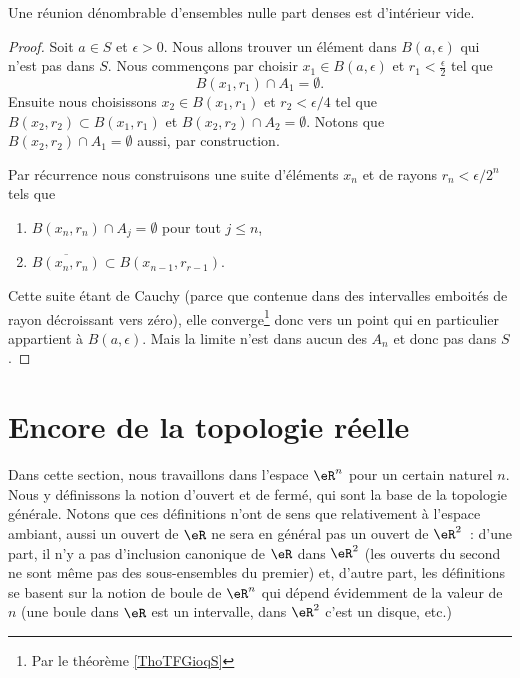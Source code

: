 \begin{theorem}      \label{ThoQGalIO}
    Une réunion dénombrable d'ensembles nulle part denses est d'intérieur vide.
\end{theorem}

\begin{proof}
    Soit \( a\in S\) et \( \epsilon>0\). Nous allons trouver un élément dans \( B(a,\epsilon)\) qui n'est pas dans \( S\). Nous commençons par choisir \( x_1\in B(a,\epsilon)\) et \( r_1<\frac{ \epsilon }{2}\) tel que
    \begin{equation}
        B(x_1,r_1)\cap A_1=\emptyset.
    \end{equation}
    Ensuite nous choisissons \( x_2\in B(x_1,r_1)\) et \( r_2<\epsilon/4\) tel que \( B(x_2,r_2)\subset B(x_1,r_1)\) et \( B(x_2,r_2)\cap A_2=\emptyset\). Notons que \( B(x_2,r_2)\cap A_1=\emptyset\) aussi, par construction.

    Par récurrence nous construisons une suite d'éléments \( x_n\) et de rayons \( r_n<\epsilon/2^n\) tels que
    \begin{enumerate}
        \item
            \( B(x_n,r_n)\cap A_j=\emptyset\) pour tout \( j\leq n\),
        \item
            \( \overline{ B(x_n,r_n) }\subset B(x_{n-1},r_{r-1})\).
    \end{enumerate}
    Cette suite étant de Cauchy (parce que contenue dans des intervalles emboités de rayon décroissant vers zéro), elle converge\footnote{Par le théorème \ref{ThoTFGioqS}} donc vers un point qui en particulier appartient à \( B(a,\epsilon)\). Mais la limite n'est dans aucun des \( A_n\) et donc pas dans \( S\).
\end{proof}

\section{Encore de la topologie réelle}

Dans cette section, nous travaillons dans l'espace $\eR^n$ pour un certain naturel $n$. Nous y définissons la notion d'ouvert et de fermé, qui sont la base de la topologie générale. Notons que ces définitions n'ont de sens que relativement à l'espace ambiant, aussi un ouvert de $\eR$ ne sera en général pas un ouvert de $\eR^2$~: d'une part, il n'y a pas d'inclusion canonique de $\eR$ dans $\eR^2$ (les ouverts du second ne sont même pas des sous-ensembles du premier) et, d'autre part, les définitions se basent sur la notion de boule de $\eR^n$ qui dépend évidemment de la valeur de $n$ (une boule dans $\eR$ est un intervalle, dans $\eR^2$ c'est un disque, etc.)

